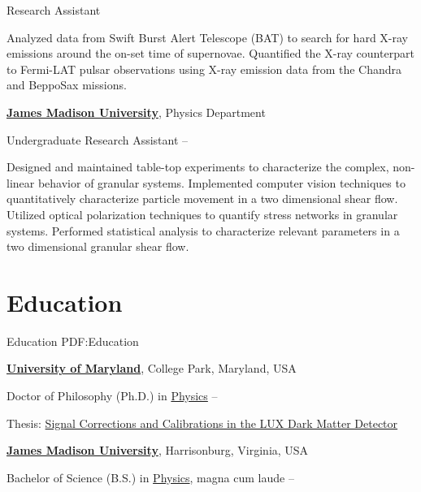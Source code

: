 \documentclass[letterpaper,MMMyyyy,nonstop]{simpleresumecv}
\begin{document}
\begin{body}
\GapNoBreak
\BulletItem
Research Assistant
\hfill
{}

\begin{detail}
\SubBulletItem
Analyzed data from Swift Burst Alert Telescope (BAT) to search for hard X-ray emissions around the on-set time of supernovae.
\SubBulletItem
Quantified the X-ray counterpart to Fermi-LAT pulsar observations using X-ray emission data from the Chandra and BeppoSax missions.
\end{detail}

\BigGap
\href{http://csma31.csm.jmu.edu/physics/}
{\textbf{James Madison University}},
Physics Department

\GapNoBreak
\BulletItem
Undergraduate Research Assistant
\hfill
{} --
\begin{detail}
\SubBulletItem
Designed and maintained table-top experiments to characterize the complex, non-linear behavior of granular systems.
\SubBulletItem
Implemented computer vision techniques to quantitatively characterize particle movement in a two dimensional shear flow.
\SubBulletItem
Utilized optical polarization techniques to quantify stress networks in granular systems.
\SubBulletItem
Performed statistical analysis to characterize relevant parameters in a two dimensional granular shear flow.
\end{detail}


\section
{Education}
{Education}
{PDF:Education}

\href{http://umd.edu/}
{\textbf{University of Maryland}},
College Park, Maryland, USA

\GapNoBreak
\BulletItem
Doctor of Philosophy (Ph.D.) in
\href{http://umdphysics.umd.edu/}
{Physics}
\hfill
{}--
\begin{detail}
\SubBulletItem
Thesis:
\href{http://updatethis}
{Signal Corrections and Calibrations in the LUX Dark Matter Detector}
\end{detail}


\BigGap
\href{http://www.jmu.edu/}
{\textbf{James Madison University}},
Harrisonburg, Virginia, USA

\GapNoBreak
\BulletItem
Bachelor of Science (B.S.) in
\href{http://csma31.csm.jmu.edu/physics/}
{Physics}, magna cum laude
\hfill
{} --


\end{body}
\end{document}
